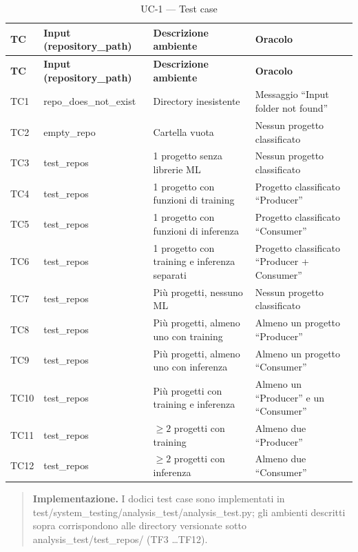 \documentclass[11pt,a4paper]{article}
\makeatletter
\newif\ifmark@prevlower
\def\mark@casebreak#1{%
  \ifcat\noexpand#1\relax
    \mark@prevlowerfalse
  \else
    \ifnum`#1=\uccode`#1\relax
      \ifmark@prevlower\allowbreak\fi
      \mark@prevlowerfalse
    \else
      \ifnum`#1=\lccode`#1\relax
        \mark@prevlowertrue
      \else
        \mark@prevlowerfalse
      \fi
    \fi
  \fi}
\def\mark@brk#1{%
  \ifx#1\mark@stop
    \let\mark@next\relax
  \else
    \mark@casebreak{#1}%
    #1%
    \ifx#1.\allowbreak\else
      \ifx#1\_\allowbreak\else
        \ifx#1/\allowbreak\else
          \ifx#1(\allowbreak\fi
        \fi
      \fi
    \fi
    \let\mark@next\mark@brk
  \fi
  \mark@next}
\def\mark@stop{\mark@stop}
\DeclareRobustCommand{\mark@code}[1]{%
  \ifmmode
    \text{\ttfamily\small\mark@prevlowerfalse\mark@brk#1\mark@stop}%
  \else
    {\ttfamily\small\mark@prevlowerfalse\mark@brk#1\mark@stop}%
  \fi}
\DeclareRobustCommand{\pkgpath}[1]{\mark@code{#1}}
\DeclareRobustCommand{\file}[1]{\mark@code{#1}}
\DeclareRobustCommand{\flag}[1]{\mark@code{#1}}
\def\mark@code#1{#1}%
\def\pkgpath#1{#1}%
\def\file#1{#1}%
\def\flag#1{#1}%
\newcommand{\thead}[1]{\textbf{#1}}
\newenvironment{keypoints}
  {\begin{quote}\small}
  {\end{quote}}
\makeatother
\begin{document}
\begin{longtable}{@{}L{1.4cm} L{3.1cm} L{3.9cm} L{6.1cm}@{}}
  \caption{UC-1 --- Test case}\label{tab:uc1-tc}\\
  \toprule
  \thead{TC} & \thead{Input (\flag{repository\_path})} &
  \thead{Descrizione ambiente} & \thead{Oracolo}\\
  \midrule
  \endfirsthead
  \toprule
  \thead{TC} & \thead{Input (\flag{repository\_path})} &
  \thead{Descrizione ambiente} & \thead{Oracolo}\\
  \midrule
  \endhead
  \bottomrule
  \endfoot
  TC1  & \file{repo\_does\_not\_exist} & Directory inesistente & Messaggio ``Input folder not found''\\
  TC2  & \file{empty\_repo}  & Cartella vuota & Nessun progetto classificato\\
  TC3  & \file{test\_repos}  & 1 progetto senza librerie ML & Nessun progetto classificato\\
  TC4  & \file{test\_repos}  & 1 progetto con funzioni di training & Progetto classificato ``Producer''\\
  TC5  & \file{test\_repos}  & 1 progetto con funzioni di inferenza & Progetto classificato ``Consumer''\\
  TC6  & \file{test\_repos}  & 1 progetto con training e inferenza separati & Progetto classificato ``Producer + Consumer''\\
  TC7  & \file{test\_repos}  & Pi\`u progetti, nessuno ML & Nessun progetto classificato\\
  TC8  & \file{test\_repos}  & Pi\`u progetti, almeno uno con training & Almeno un progetto ``Producer''\\
  TC9  & \file{test\_repos}  & Pi\`u progetti, almeno uno con inferenza & Almeno un progetto ``Consumer''\\
  TC10 & \file{test\_repos}  & Pi\`u progetti con training e inferenza & Almeno un ``Producer'' e un ``Consumer''\\
  TC11 & \file{test\_repos}  & $\geq 2$ progetti con training & Almeno due ``Producer''\\
  TC12 & \file{test\_repos}  & $\geq 2$ progetti con inferenza & Almeno due ``Consumer''\\
\end{longtable}

\begin{keypoints}
\textbf{Implementazione.} I dodici test case sono implementati in
\file{test/system\_testing/analysis\_test/analysis\_test.py}; gli ambienti
descritti sopra corrispondono alle directory versionate sotto
\pkgpath{analysis\_test/test\_repos/} (TF3 \ldots TF12).
\end{keypoints}
\end{document}
